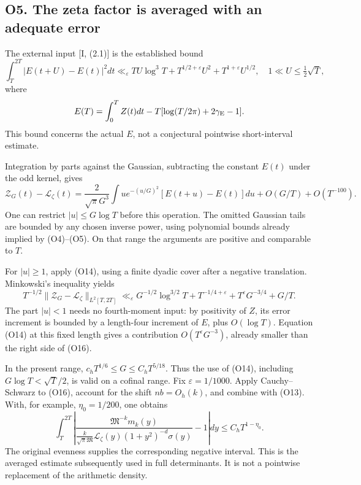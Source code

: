\documentclass[11pt,a4paper]{article}
\begin{document}
\subsection{O5. The zeta factor is averaged with an adequate
error}\label{sa:o5.-the-zeta-factor-is-averaged-with-an-adequate-error}

The external input {[}I, (2.1){]} is the established bound \[
\int_T^{2T}|E(t+U)-E(t)|^2dt
\ll_\varepsilon TU\log^3T+
T^{1/2+\varepsilon}U^2+T^{1+\varepsilon}U^{1/2},
\quad 1\ll U\le\tfrac12\sqrt T,
\tag{O14}
\] where \[
E(T)=\int_0^T Z(t)dt-T[\log(T/2\pi)+2\gamma_{\rm E}-1].
\] This bound concerns the actual \(E\), not a conjectural pointwise
short-interval estimate.

Integration by parts against the Gaussian, subtracting the constant
\(E(t)\) under the odd kernel, gives \[
\mathcal Z_G(t)-\mathcal L_\zeta(t)
=\frac2{\sqrt\pi G^3}\int u e^{-(u/G)^2}
[E(t+u)-E(t)]du+O(G/T)+O(T^{-100}).\tag{O15}
\] One can restrict \(|u|\le G\log T\) before this operation. The
omitted Gaussian tails are bounded by any chosen inverse power, using
polynomial bounds already implied by (O4)--(O5). On that range the
arguments are positive and comparable to \(T\).

For \(|u|\ge1\), apply (O14), using a finite dyadic cover after a
negative translation. Minkowski's inequality yields \[
\boxed{T^{-1/2}\|\mathcal Z_G-\mathcal L_\zeta\|_{L^2[T,2T]}
\ll_\varepsilon
G^{-1/2}\log^{3/2}T+T^{-1/4+\varepsilon}
+T^\varepsilon G^{-3/4}+G/T.}\tag{O16}
\] The part \(|u|<1\) needs no fourth-moment input: by positivity of
\(Z\), its error increment is bounded by a length-four increment of
\(E\), plus \(O(\log T)\). Equation (O14) at this fixed length gives a
contribution \(O(T^\varepsilon G^{-3})\), already smaller than the right
side of (O16).

In the present range, \(c_hT^{1/6}\le G\le C_hT^{5/18}\). Thus the use
of (O14), including \(G\log T<\sqrt T/2\), is valid on a cofinal range.
Fix \(\varepsilon=1/1000\). Apply Cauchy--Schwarz to (O16), account for
the shift \(nb=O_h(k)\), and combine with (O13). With, for example,
\(\eta_0=1/200\), one obtains \[
\boxed{\int_T^{2T}
\left|\frac{\mathfrak M^{-k}m_k(y)}
{\frac{k}{\sqrt\pi\mathfrak M}\mathcal L_\zeta(y)
(1+y^2)^{-d}\sigma(y)}-1\right|dy
\le C_hT^{1-\eta_0}.}\tag{O17}
\] The original evenness supplies the corresponding negative interval.
This is the averaged estimate subsequently used in full determinants. It
is not a pointwise replacement of the arithmetic density.
\end{document}
